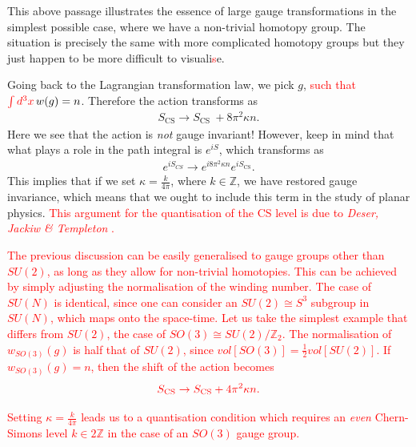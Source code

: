This above passage illustrates the essence of large gauge transformations in the simplest possible case, where we have a non-trivial homotopy group. The situation is precisely the same with more complicated homotopy groups but they just happen to be more difficult to visuali\textcolor{red}{s}e.

    Going back to the Lagrangian transformation law, we pick $g$, \textcolor{red}{such that} $\textcolor{red}{\int d^3 x} \,w(g)=n$. Therefore the action transforms as
    \begin{align}
        S_{\text{CS}} \rightarrow S_{\text{CS } }+ 8 \pi^2 \kappa n.
    \end{align}
    Here we see that the action is \textit{not} gauge invariant! However, keep in mind that what plays a role in the path integral is $e^{i S}$, which transforms as
    \begin{align}
        e^{i S_{CS}} \rightarrow e^{i 8 \pi^2 \kappa n} e^{i S_{\text{CS}}}.
    \end{align}
    This implies that if we set $\kappa = \frac{k}{4 \pi}$, where $k\in \mathbb{Z}$, we have restored gauge invariance, which means that we ought to include this term in the study of planar physics. \textcolor{red}{This argument for the quantisation of the CS level is due to \textit{Deser, Jackiw \& Templeton} \cite{Deser:1981wh}. }

    \textcolor{red}{The previous discussion can be easily generali\textcolor{red}{s}ed to gauge groups  other than $SU(2)$, as long as they allow for non-trivial homotopies. This can be achieved by simply adjusting the normali\textcolor{red}{s}ation of the winding number. The case of $SU(N)$ is identical, since one can consider an $SU(2) \cong S^3$ subgroup in $SU(N)$, which maps onto the space-time. Let us take the simplest example that differs from $SU(2)$, the case of $SO(3)\cong SU(2)/ \mathbb{Z}_2$. The normali\textcolor{red}{s}ation of $w_{SO(3)}(g)$ is half that of $SU(2)$, since $vol[SO(3)] = \frac{1}{2} vol[SU(2)]$. If $w_{SO(3)}(g)=n$, then the shift of the action becomes }
\begin{align}
    \textcolor{red}{S_{\text{CS}} \rightarrow S_{\text{CS}}+ 4\pi^2 \kappa n.}
\end{align}

\textcolor{red}{Setting $\kappa = \frac{k}{4 \pi}$ leads us to a quanti\textcolor{red}{s}ation condition which requires an \textit{even} Chern-Simons level $k \in 2\mathbb{Z}$ in the case of an $SO(3)$ gauge group.}

